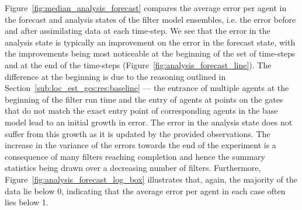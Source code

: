 \documentclass{article}
\begin{document}
Figure~\ref{fig:median_analysis_forecast} compares the average error per agent in the forecast and analysis states of the filter model ensembles, i.e. the error before and after assimilating data at each time-step.  We see that the error in the analysis state is typically an improvement on the error in the forecast state, with the improvements being most noticeable at the beginning of the set of time-steps and at the end of the time-steps (Figure~\ref{fig:analysis_forecast_line}). The difference at the beginning is due to the reasoning outlined in Section~\ref{sub:loc_est_gcs:res:baseline} --- the entrance of multiple agents at the beginning of the filter run time and the entry of agents at points on the gates that do not match the exact entry point of corresponding agents in the base model lead to an initial growth in error. The error in the analysis state does not suffer from this growth as it is
updated by the provided observations.  The increase in the variance of the errors towards the end of the experiment is a consequence of many filters reaching completion and hence the summary statistics being drawn over a decreasing number of filters. Furthermore, Figure~\ref{fig:analysis_forecast_log_box} illustrates that, again, the majority of the data lie below 0, indicating that the average error per agent in each case often lies below 1.
\end{document}
